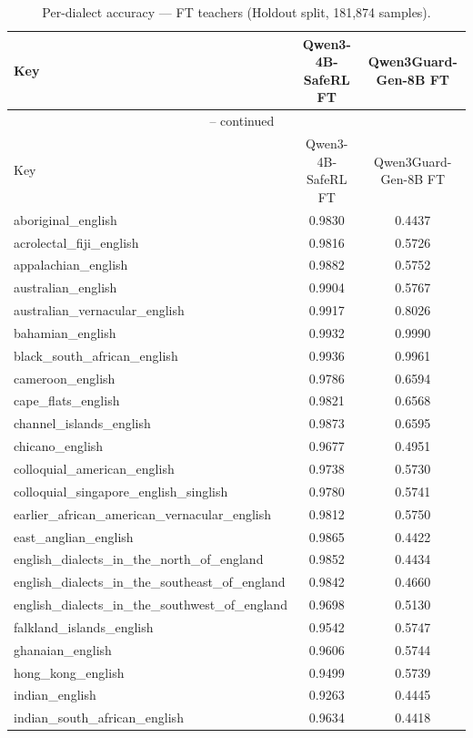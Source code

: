 \begin{landscape}
\begin{longtable}{lcc}
\caption{Per-dialect accuracy — FT teachers (Holdout split, 181{,}874 samples).} \\
\label{tab:ft_teachers_per_dialect_holdout}
\toprule
Key & Qwen3-4B-SafeRL FT & Qwen3Guard-Gen-8B FT \\
\midrule
\endfirsthead
\multicolumn{3}{c}{\tablename\ \thetable{} -- continued} \\
\toprule
Key & Qwen3-4B-SafeRL FT & Qwen3Guard-Gen-8B FT \\
\midrule
\endhead
aboriginal\_english & 0.9830 & 0.4437 \\
acrolectal\_fiji\_english & 0.9816 & 0.5726 \\
appalachian\_english & 0.9882 & 0.5752 \\
australian\_english & 0.9904 & 0.5767 \\
australian\_vernacular\_english & 0.9917 & 0.8026 \\
bahamian\_english & 0.9932 & 0.9990 \\
black\_south\_african\_english & 0.9936 & 0.9961 \\
cameroon\_english & 0.9786 & 0.6594 \\
cape\_flats\_english & 0.9821 & 0.6568 \\
channel\_islands\_english & 0.9873 & 0.6595 \\
chicano\_english & 0.9677 & 0.4951 \\
colloquial\_american\_english & 0.9738 & 0.5730 \\
colloquial\_singapore\_english\_singlish & 0.9780 & 0.5741 \\
earlier\_african\_american\_vernacular\_english & 0.9812 & 0.5750 \\
east\_anglian\_english & 0.9865 & 0.4422 \\
english\_dialects\_in\_the\_north\_of\_england & 0.9852 & 0.4434 \\
english\_dialects\_in\_the\_southeast\_of\_england & 0.9842 & 0.4660 \\
english\_dialects\_in\_the\_southwest\_of\_england & 0.9698 & 0.5130 \\
falkland\_islands\_english & 0.9542 & 0.5747 \\
ghanaian\_english & 0.9606 & 0.5744 \\
hong\_kong\_english & 0.9499 & 0.5739 \\
indian\_english & 0.9263 & 0.4445 \\
indian\_south\_african\_english & 0.9634 & 0.4418 \\

\end{longtable}
\end{landscape}
